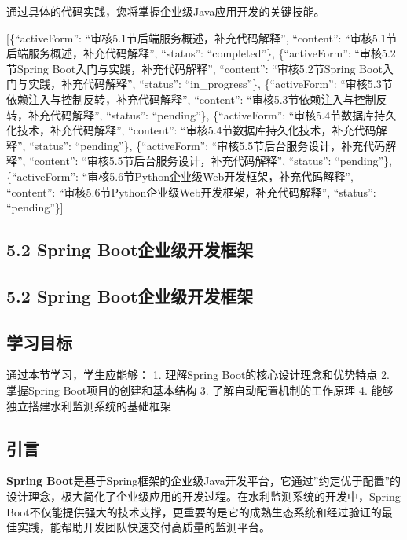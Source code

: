 通过具体的代码实践，您将掌握企业级Java应用开发的关键技能。

{[}\{``activeForm'': ``审核5.1节后端服务概述，补充代码解释'', ``content'': ``审核5.1节后端服务概述，补充代码解释'', ``status'': ``completed''\}, \{``activeForm'': ``审核5.2节Spring Boot入门与实践，补充代码解释'', ``content'': ``审核5.2节Spring Boot入门与实践，补充代码解释'', ``status'': ``in\_progress''\}, \{``activeForm'': ``审核5.3节依赖注入与控制反转，补充代码解释'', ``content'': ``审核5.3节依赖注入与控制反转，补充代码解释'', ``status'': ``pending''\}, \{``activeForm'': ``审核5.4节数据库持久化技术，补充代码解释'', ``content'': ``审核5.4节数据库持久化技术，补充代码解释'', ``status'': ``pending''\}, \{``activeForm'': ``审核5.5节后台服务设计，补充代码解释'', ``content'': ``审核5.5节后台服务设计，补充代码解释'', ``status'': ``pending''\}, \{``activeForm'': ``审核5.6节Python企业级Web开发框架，补充代码解释'', ``content'': ``审核5.6节Python企业级Web开发框架，补充代码解释'', ``status'': ``pending''\}{]}

\subsection{5.2 Spring Boot企业级开发框架}\label{spring-bootux4f01ux4e1aux7ea7ux5f00ux53d1ux6846ux67b6}

\subsection{5.2 Spring Boot企业级开发框架}\label{spring-bootux4f01ux4e1aux7ea7ux5f00ux53d1ux6846ux67b6-1}

\subsection{学习目标}\label{ux5b66ux4e60ux76eeux6807-2}

通过本节学习，学生应能够： 1. 理解Spring Boot的核心设计理念和优势特点 2. 掌握Spring Boot项目的创建和基本结构 3. 了解自动配置机制的工作原理 4. 能够独立搭建水利监测系统的基础框架

\subsection{引言}\label{ux5f15ux8a00-2}

\textbf{Spring Boot}是基于Spring框架的企业级Java开发平台，它通过''约定优于配置''的设计理念，极大简化了企业级应用的开发过程。在水利监测系统的开发中，Spring Boot不仅能提供强大的技术支撑，更重要的是它的成熟生态系统和经过验证的最佳实践，能帮助开发团队快速交付高质量的监测平台。

